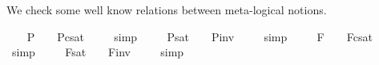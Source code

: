 \begin{isabellebody}
%
\isadelimproof
%
\endisadelimproof
%
\isamarkuptrue%
%
\begin{isamarkuptext}%
We check some well know relations between meta-logical notions.%
\end{isamarkuptext}%
\isamarkuptrue%
\ \isamarkupfalse%
\ \ {\isachardoublequoteopen}{\isacharbrackleft}{\isasymphi}\isactrlsup P{\isacharbrackright}\ {\isacharequal}\ {\isasymtop}\ {\isasymlongleftrightarrow}\ {\isacharbrackleft}{\isasymphi}\isactrlsup P{\isacharbrackright}\isactrlsup c\isactrlsup s\isactrlsup a\isactrlsup t\ {\isacharequal}\ {\isasymbottom}{\isachardoublequoteclose}%
\isadelimproof
\ %
\endisadelimproof
%
\isatagproof
{}\isamarkupfalse%
\ simp\ \isamarkupfalse%
%
\endisatagproof
{\isafoldproof}%
%
\isadelimproof
%
\endisadelimproof
\isanewline
\ \isamarkupfalse%
\ \ {\isachardoublequoteopen}{\isacharbrackleft}{\isasymphi}\isactrlsup P{\isacharbrackright}\isactrlsup s\isactrlsup a\isactrlsup t\ {\isacharequal}\ {\isasymtop}\ {\isasymlongleftrightarrow}\ {\isacharbrackleft}{\isasymphi}\isactrlsup P{\isacharbrackright}\isactrlsup i\isactrlsup n\isactrlsup v\ {\isacharequal}\ {\isasymbottom}{\isachardoublequoteclose}%
\isadelimproof
\ %
\endisadelimproof
%
\isatagproof
{}\isamarkupfalse%
\ simp\ \isamarkupfalse%
%
\endisatagproof
{\isafoldproof}%
%
\isadelimproof
%
\endisadelimproof
\isanewline
\ \isamarkupfalse%
\ \ {\isachardoublequoteopen}{\isacharbrackleft}{\isasymphi}\isactrlsup F{\isacharbrackright}\ {\isacharequal}\ {\isasymtop}\ {\isasymlongleftrightarrow}\ {\isacharbrackleft}{\isasymphi}\isactrlsup F{\isacharbrackright}\isactrlsup c\isactrlsup s\isactrlsup a\isactrlsup t\ {\isacharequal}\ {\isasymbottom}{\isachardoublequoteclose}%
\isadelimproof
\ %
\endisadelimproof
%
\isatagproof
{}\isamarkupfalse%
\ simp\ \isamarkupfalse%
%
\endisatagproof
{\isafoldproof}%
%
\isadelimproof
%
\endisadelimproof
\isanewline
\ \isamarkupfalse%
\ \ {\isachardoublequoteopen}{\isacharbrackleft}{\isasymphi}\isactrlsup F{\isacharbrackright}\isactrlsup s\isactrlsup a\isactrlsup t\ {\isacharequal}\ {\isasymtop}\ {\isasymlongleftrightarrow}\ {\isacharbrackleft}{\isasymphi}\isactrlsup F{\isacharbrackright}\isactrlsup i\isactrlsup n\isactrlsup v\ {\isacharequal}\ {\isasymbottom}{\isachardoublequoteclose}%
\isadelimproof
\ %
\endisadelimproof
%
\isatagproof
{}\isamarkupfalse%
\ simp\ \isamarkupfalse%

\end{isabellebody}
